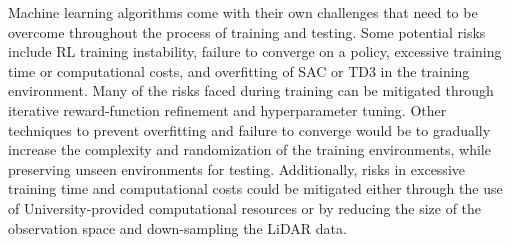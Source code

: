 \documentclass[conference]{IEEEtran}
\begin{document}
Machine learning algorithms come with their own challenges that need to be overcome throughout the process of training and testing.
Some potential risks include RL training instability, failure to converge on a policy, excessive training time or computational costs, and overfitting of SAC or TD3 in the training environment.
Many of the risks faced during training can be mitigated through iterative reward-function refinement and hyperparameter tuning.
Other techniques to prevent overfitting and failure to converge would be to gradually increase the complexity and randomization of the training environments, while preserving unseen environments for testing.
Additionally, risks in excessive training time and computational costs could be mitigated either through the use of University-provided computational resources or by reducing the size of the observation space and down-sampling the LiDAR data. 





\end{document}
